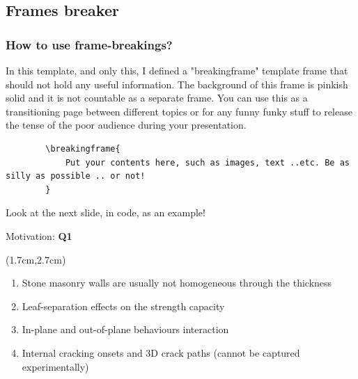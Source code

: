 \documentclass{presentation_template}
\begin{document}
\subsection{Frames breaker}
\begin{frame}[fragile]
\frametitle{How to use frame-breakings?}
    In this template, and only this, I defined a "breakingframe" template frame that should not hold any useful information. The background of this frame is pinkish solid and it is not countable as a separate frame. You can use this as a transitioning page between different topics or for any funny funky stuff to release the tense of the poor audience during your presentation.
    \vspace{10pt}
    \begin{lstlisting}
        \breakingframe{
            Put your contents here, such as images, text ..etc. Be as silly as possible .. or not!
        }
    \end{lstlisting}
    \vspace{10pt}
    Look at the next slide, in code, as an example!
\end{frame}

\begin{frame}[t]{Motivation: \textcolor{myviolet}{{\textbf{Q1}}}}\vspace{10pt}
    \begin{textblock*}{13cm}(1.7cm,2.7cm)
    \begin{enumerate}[<+->]
    \setlength\itemsep{10pt}
        \item Stone masonry walls are usually not homogeneous through the thickness
        \item Leaf-separation effects on the strength capacity
        \item In-plane and out-of-plane behaviours interaction
        \item Internal cracking onsets and 3D crack paths (cannot be captured experimentally)
    \end{enumerate}
    \end{textblock*}
\end{frame}
\end{document}
